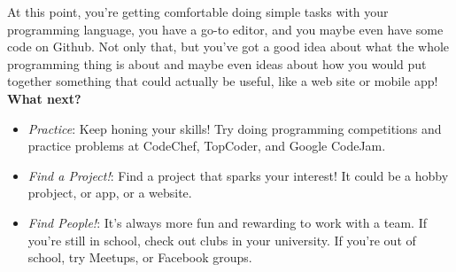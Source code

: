 \documentclass{article}
\begin{document}
At this point, you're getting comfortable doing simple tasks with your
programming language, you have a go-to editor, and you maybe even have some
code on Github. Not only that, but you've got a good idea about what the whole
programming thing is about and maybe even ideas about how you would put
together something that could actually be useful, like a web site or mobile
app! \textbf{What next?}

\begin{itemize}
  \item \textit{Practice}: Keep honing your skills! Try doing programming
  competitions and practice problems at CodeChef, TopCoder, and Google CodeJam.
  \item \textit{Find a Project!}: Find a project that sparks your interest! It
  could be a hobby probject, or app, or a website.
  \item \textit{Find People!}: It's always more fun and rewarding to work with
  a team. If you're still in school, check out clubs in your university. If
  you're out of school, try Meetups, or Facebook groups.
\end{itemize}
\end{document}

